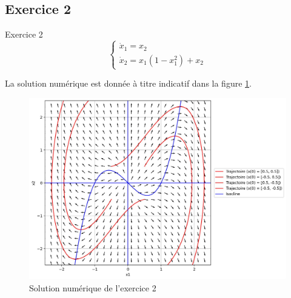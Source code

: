         \subsection{Exercice 2}
            \begin{exercise}{Exercice 2}
                \begin{equation}
                    \begin{cases}
                        \dot{x}_1 = x_2 \\
                        \dot{x}_2 = x_1(1 - x_1^2) + x_2
                    \end{cases}
                \end{equation}
            \end{exercise}
            La solution numérique est donnée à titre indicatif dans la figure \ref{fig:pdp_exercice_3_2}.
            \begin{figure}[ht!]
                \centering
                \includegraphics[width=\textwidth]{images/pdp_exercice_3_2.jpg}
                \caption{Solution numérique de l'exercice 2}
                \label{fig:pdp_exercice_3_2}
            \end{figure}

